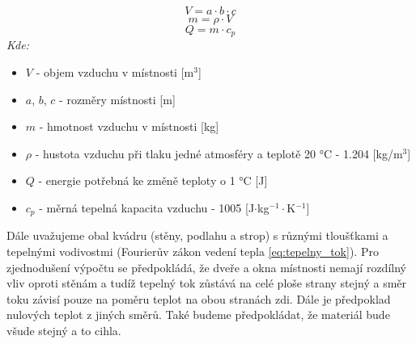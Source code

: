 \begin{equation}
    V = a \cdot b \cdot c
    \label{eq:objem}
\end{equation}
\begin{equation}
    m = \rho \cdot V
    \label{eq:hmotnost}
\end{equation}
\begin{equation}
    Q = m \cdot c_p
    \label{eq:energie}
\end{equation}
\noindent\textit{Kde:}
\begin{itemize}
    \item $V$ - objem vzduchu v místnosti [m$^3$]
    \item $a$, $b$, $c$ - rozměry místnosti [m]
    \item $m$ - hmotnost vzduchu v místnosti [kg]
    \item $\rho$ - hustota vzduchu při tlaku jedné atmosféry a teplotě 20 °C - 1.204 [kg/m$^3$]
    \item $Q$ - energie potřebná ke změně teploty o 1 °C [J]
    \item $c_p$ - měrná tepelná kapacita vzduchu - 1005 [J$\cdot$kg$^{-1}\cdot$K$^{-1}$] \newline
\end{itemize}
\noindent Dále uvažujeme obal kvádru (stěny, podlahu a strop) s různými tloušťkami a tepelnými vodivostmi (Fourierův zákon vedení tepla \ref{eq:tepelny_tok}). Pro zjednodušení výpočtu se předpokládá, že dveře a okna místnosti nemají rozdílný vliv oproti stěnám a tudíž tepelný tok zůstává na celé ploše strany stejný a směr toku závisí pouze na poměru teplot na obou stranách zdi. Dále je předpoklad nulových teplot z jiných směrů. Také budeme předpokládat, že materiál bude všude stejný a to cihla. 

